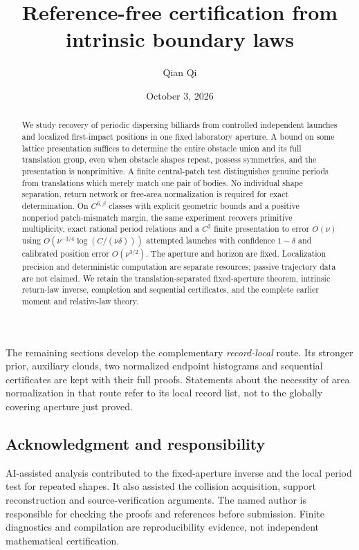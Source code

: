 \documentclass[11pt]{amsart}
\title[Reference-free certification]{Reference-free certification from intrinsic boundary laws}
\author{Qian Qi}\date{October 3, 2026}
\theoremstyle{definition}\newtheorem{definition}[theorem]{Definition}
\theoremstyle{remark}\newtheorem{remark}[theorem]{Remark}
\numberwithin{equation}{section}
\begin{document}
\raggedbottom
\begin{abstract}
We study recovery of periodic dispersing billiards from controlled
independent launches and localized first-impact positions in one fixed
laboratory aperture. A bound on some lattice presentation suffices to
determine the entire obstacle union and its full translation group,
even when obstacle shapes repeat, possess symmetries, and the presentation
is nonprimitive. A finite central-patch test distinguishes genuine periods
from translations which merely match one pair of bodies. No individual
shape separation, return network or free-area normalization is required
for exact determination. On $C^{6,\beta}$ classes with explicit geometric
bounds and a positive nonperiod patch-mismatch margin, the same experiment
recovers primitive multiplicity, exact rational period relations and a
$C^2$ finite presentation to error $O(\nu)$ using
$O(\nu^{-3/4}\log(C/(\nu\delta)))$ attempted launches with confidence
$1-\delta$ and calibrated position error $O(\nu^{3/2})$. The aperture and
horizon are fixed. Localization precision and deterministic computation
are separate resources; passive trajectory data are not claimed.
We retain the translation-separated fixed-aperture theorem, intrinsic
return-law inverse, completion and sequential certificates, and the
complete earlier moment and relative-law theory.
\end{abstract}
\maketitle


\bigskip\noindent
The remaining sections develop the complementary \emph{record-local}
route. Its stronger prior, auxiliary clouds, two normalized endpoint
histograms and sequential certificates are kept with their full proofs.
Statements about the necessity of area normalization in that route refer
to its local record list, not to the globally covering aperture just proved.







\subsection*{Acknowledgment and responsibility}
AI-assisted analysis contributed to the fixed-aperture inverse and the
local period test for repeated shapes. It also assisted the collision
acquisition, support reconstruction and source-verification arguments.
The named author is responsible for checking the proofs and references
before submission. Finite diagnostics and compilation are reproducibility
evidence, not independent mathematical certification.

\end{document}
